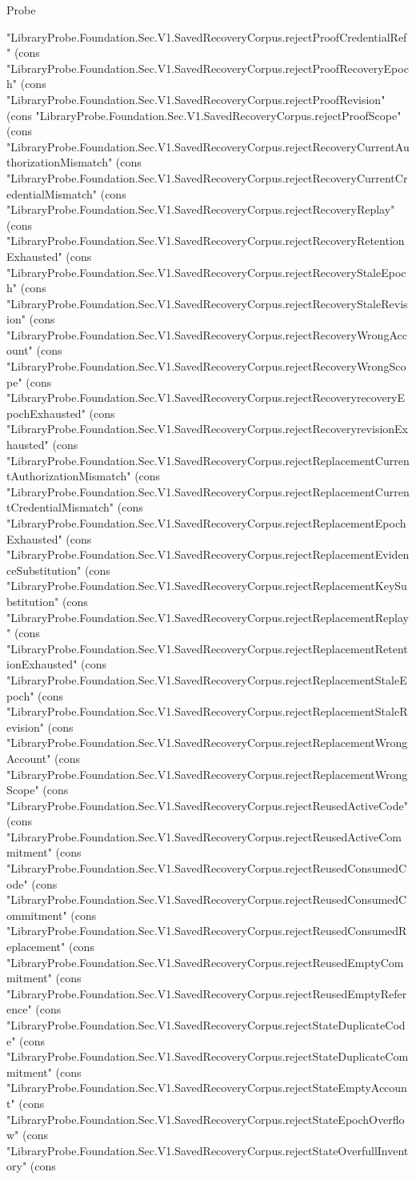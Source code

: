\begin{lexlean}{Probe}
\begin{semanticmodule}
{"LibraryProbe.Foundation.Sec.V1.SavedRecoveryCorpus.rejectProofCredentialRef" (cons "LibraryProbe.Foundation.Sec.V1.SavedRecoveryCorpus.rejectProofRecoveryEpoch" (cons "LibraryProbe.Foundation.Sec.V1.SavedRecoveryCorpus.rejectProofRevision" (cons "LibraryProbe.Foundation.Sec.V1.SavedRecoveryCorpus.rejectProofScope" (cons "LibraryProbe.Foundation.Sec.V1.SavedRecoveryCorpus.rejectRecoveryCurrentAuthorizationMismatch" (cons "LibraryProbe.Foundation.Sec.V1.SavedRecoveryCorpus.rejectRecoveryCurrentCredentialMismatch" (cons "LibraryProbe.Foundation.Sec.V1.SavedRecoveryCorpus.rejectRecoveryReplay" (cons "LibraryProbe.Foundation.Sec.V1.SavedRecoveryCorpus.rejectRecoveryRetentionExhausted" (cons "LibraryProbe.Foundation.Sec.V1.SavedRecoveryCorpus.rejectRecoveryStaleEpoch" (cons "LibraryProbe.Foundation.Sec.V1.SavedRecoveryCorpus.rejectRecoveryStaleRevision" (cons "LibraryProbe.Foundation.Sec.V1.SavedRecoveryCorpus.rejectRecoveryWrongAccount" (cons "LibraryProbe.Foundation.Sec.V1.SavedRecoveryCorpus.rejectRecoveryWrongScope" (cons "LibraryProbe.Foundation.Sec.V1.SavedRecoveryCorpus.rejectRecoveryrecoveryEpochExhausted" (cons "LibraryProbe.Foundation.Sec.V1.SavedRecoveryCorpus.rejectRecoveryrevisionExhausted" (cons "LibraryProbe.Foundation.Sec.V1.SavedRecoveryCorpus.rejectReplacementCurrentAuthorizationMismatch" (cons "LibraryProbe.Foundation.Sec.V1.SavedRecoveryCorpus.rejectReplacementCurrentCredentialMismatch" (cons "LibraryProbe.Foundation.Sec.V1.SavedRecoveryCorpus.rejectReplacementEpochExhausted" (cons "LibraryProbe.Foundation.Sec.V1.SavedRecoveryCorpus.rejectReplacementEvidenceSubstitution" (cons "LibraryProbe.Foundation.Sec.V1.SavedRecoveryCorpus.rejectReplacementKeySubstitution" (cons "LibraryProbe.Foundation.Sec.V1.SavedRecoveryCorpus.rejectReplacementReplay" (cons "LibraryProbe.Foundation.Sec.V1.SavedRecoveryCorpus.rejectReplacementRetentionExhausted" (cons "LibraryProbe.Foundation.Sec.V1.SavedRecoveryCorpus.rejectReplacementStaleEpoch" (cons "LibraryProbe.Foundation.Sec.V1.SavedRecoveryCorpus.rejectReplacementStaleRevision" (cons "LibraryProbe.Foundation.Sec.V1.SavedRecoveryCorpus.rejectReplacementWrongAccount" (cons "LibraryProbe.Foundation.Sec.V1.SavedRecoveryCorpus.rejectReplacementWrongScope" (cons "LibraryProbe.Foundation.Sec.V1.SavedRecoveryCorpus.rejectReusedActiveCode" (cons "LibraryProbe.Foundation.Sec.V1.SavedRecoveryCorpus.rejectReusedActiveCommitment" (cons "LibraryProbe.Foundation.Sec.V1.SavedRecoveryCorpus.rejectReusedConsumedCode" (cons "LibraryProbe.Foundation.Sec.V1.SavedRecoveryCorpus.rejectReusedConsumedCommitment" (cons "LibraryProbe.Foundation.Sec.V1.SavedRecoveryCorpus.rejectReusedConsumedReplacement" (cons "LibraryProbe.Foundation.Sec.V1.SavedRecoveryCorpus.rejectReusedEmptyCommitment" (cons "LibraryProbe.Foundation.Sec.V1.SavedRecoveryCorpus.rejectReusedEmptyReference" (cons "LibraryProbe.Foundation.Sec.V1.SavedRecoveryCorpus.rejectStateDuplicateCode" (cons "LibraryProbe.Foundation.Sec.V1.SavedRecoveryCorpus.rejectStateDuplicateCommitment" (cons "LibraryProbe.Foundation.Sec.V1.SavedRecoveryCorpus.rejectStateEmptyAccount" (cons "LibraryProbe.Foundation.Sec.V1.SavedRecoveryCorpus.rejectStateEpochOverflow" (cons "LibraryProbe.Foundation.Sec.V1.SavedRecoveryCorpus.rejectStateOverfullInventory" (cons }
\end{semanticmodule}
\end{lexlean}
